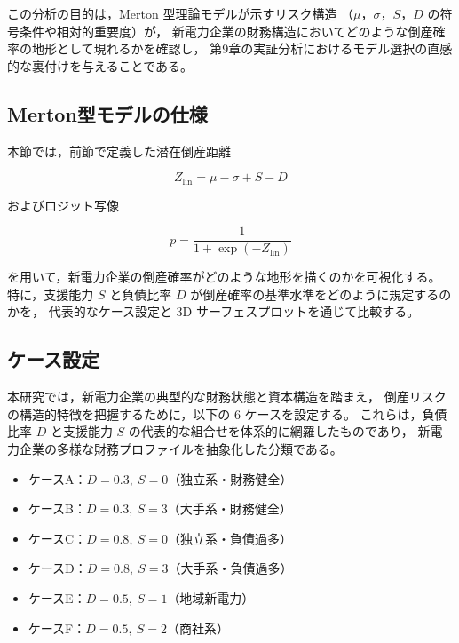 この分析の目的は，Merton 型理論モデルが示すリスク構造
（$\mu$，$\sigma$，$S$，$D$ の符号条件や相対的重要度）が，
新電力企業の財務構造においてどのような倒産確率の地形として現れるかを確認し，
第9章の実証分析におけるモデル選択の直感的な裏付けを与えることである。


\subsection{Merton型モデルの仕様}

本節では，前節で定義した潜在倒産距離


\[
Z_{\text{lin}} = \mu - \sigma + S - D
\]


およびロジット写像


\[
p = \frac{1}{1 + \exp(-Z_{\text{lin}})}
\]


を用いて，新電力企業の倒産確率がどのような地形を描くのかを可視化する。
特に，支援能力 $S$ と負債比率 $D$ が倒産確率の基準水準をどのように規定するのかを，
代表的なケース設定と 3D サーフェスプロットを通じて比較する。

\subsection{ケース設定}

本研究では，新電力企業の典型的な財務状態と資本構造を踏まえ，
倒産リスクの構造的特徴を把握するために，以下の 6 ケースを設定する。
これらは，負債比率 $D$ と支援能力 $S$ の代表的な組合せを体系的に網羅したものであり，
新電力企業の多様な財務プロファイルを抽象化した分類である。

\begin{itemize}
    \item ケースA：$D=0.3,\ S=0$（独立系・財務健全）
    \item ケースB：$D=0.3,\ S=3$（大手系・財務健全）
    \item ケースC：$D=0.8,\ S=0$（独立系・負債過多）
    \item ケースD：$D=0.8,\ S=3$（大手系・負債過多）
    \item ケースE：$D=0.5,\ S=1$（地域新電力）
    \item ケースF：$D=0.5,\ S=2$（商社系）
\end{itemize}

